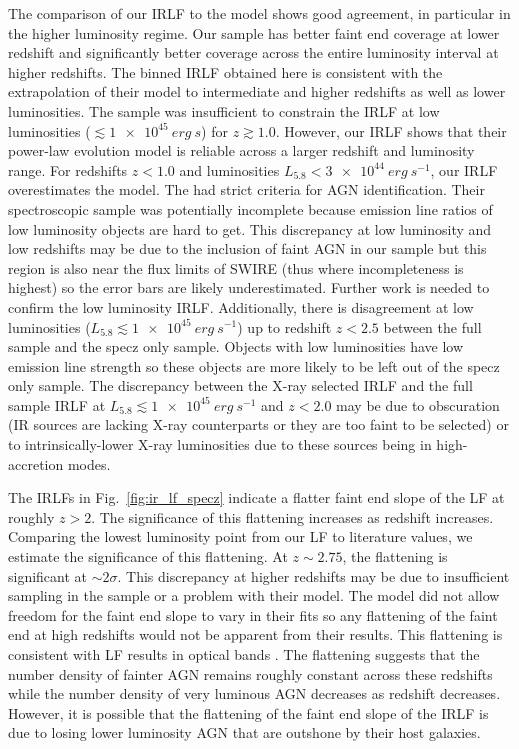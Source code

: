 \documentclass[twocolumn, trackchanges]{aastex63}
\begin{document}
The comparison of our IRLF to the \cite{lacy_spitzer_2015} model shows good agreement, in particular in the higher luminosity regime.
Our sample has better faint end coverage at lower redshift and significantly better coverage across the entire luminosity interval at higher redshifts.
The binned IRLF obtained here is consistent with the extrapolation of their model to intermediate and higher redshifts as well as lower luminosities.
The \cite{lacy_spitzer_2015} sample was insufficient to constrain the IRLF at low luminosities ($\lesssim\SI{1e45}{erg~s}$) for $z\gtrsim 1.0$. 
However, our IRLF shows that their power-law evolution model is reliable across a larger redshift and luminosity range.
For redshifts $z<1.0$ and luminosities $L_{5.8}<\SI{3e44}{erg~s^{-1}}$, our IRLF overestimates the \cite{lacy_spitzer_2015} model.
The \cite{lacy_spitzer_2015} had strict criteria for AGN identification.
Their spectroscopic sample was potentially incomplete because emission line ratios of low luminosity objects are hard to get.
This discrepancy at low luminosity and low redshifts may be due to the inclusion of faint AGN in our sample but this region is also near the flux limits of SWIRE (thus where incompleteness is highest) so the error bars are likely underestimated.
Further work is needed to confirm the low luminosity IRLF.
Additionally, there is disagreement at low luminosities ($L_{5.8}\lesssim\SI{1e45}{erg~s^{-1}}$) up to redshift $z<2.5$ between the full sample and the specz only sample.
Objects with low luminosities have low emission line strength so these objects are more likely to be left out of the specz only sample.
The discrepancy between the X-ray selected IRLF and the full sample IRLF at $L_{5.8}\lesssim\SI{1e45}{erg~s^{-1}}$ and $z<2.0$ may be due to obscuration (IR sources are lacking X-ray counterparts or they are too faint to be selected) or to intrinsically-lower X-ray luminosities due to these sources being in high-accretion modes. 

The IRLFs in Fig.~\ref{fig:ir_lf_specz} indicate a flatter faint end slope of the LF at roughly $z>2$.
The significance of this flattening increases as redshift increases.
Comparing the lowest luminosity point from our LF to literature values, we estimate the significance of this flattening.
At $z\sim 2.75$, the flattening is significant at $\sim 2 \sigma$.
This discrepancy at higher redshifts may be due to insufficient sampling in the \cite{lacy_spitzer_2015} sample or a problem with their model.
The model did not allow freedom for the faint end slope to vary in their fits so any flattening of the faint end at high redshifts would not be apparent from their results.
This flattening is consistent with LF results in optical bands \citep{ross_sdss-iii_2013}.
The flattening suggests that the number density of fainter AGN remains roughly constant across these redshifts while the number density of very luminous AGN decreases as redshift decreases.
However, it is possible that the flattening of the faint end slope of the IRLF is due to losing lower luminosity AGN that are outshone by their host galaxies.
\end{document}
